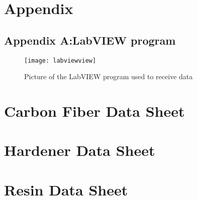 \begin{appendices}
\chapter{Appendix}
\newpage
\section{Appendix A:LabVIEW program}
\begin{figure}
  \texttt{[image: labviewview]}
  \caption{Picture of the LabVIEW program used to receive data}
  \label{app:labviewview}
\end{figure}

\chapter{Carbon Fiber Data Sheet}
\label{app:carbonfiberdatasheet}
\chapter{Hardener Data Sheet}
\label{app:hardener}
\chapter{Resin Data Sheet}
\label{app:resin}
\end{appendices}

